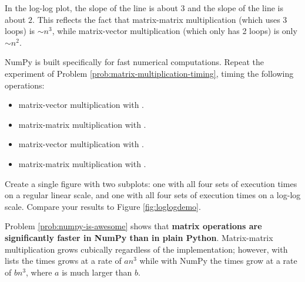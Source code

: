 In the log-log plot, the slope of the  line is about $3$ and the slope of the  line is about $2$.
This reflects the fact that matrix-matrix multiplication (which uses 3  loops) is $\sim n^3$, while matrix-vector multiplication (which only has 2 loops) is only $\sim n^2$.

\begin{problem} %
NumPy is built specifically for fast numerical computations.
Repeat the experiment of Problem \ref{prob:matrix-multiplication-timing}, timing the following operations:
%
\begin{itemize}
\item matrix-vector multiplication with .
\item matrix-matrix multiplication with .
\item matrix-vector multiplication with .
\item matrix-matrix multiplication with .
\end{itemize}

Create a single figure with two subplots: one with all four sets of execution times on a regular linear scale, and one with all four sets of execution times on a log-log scale.
Compare your results to Figure \ref{fig:loglogdemo}.
\label{prob:numpy-is-awesome}
\end{problem}


\begin{info} %
Problem \ref{prob:numpy-is-awesome} shows that \textbf{matrix  operations are significantly faster in NumPy than in plain Python}.
Matrix-matrix multiplication grows cubically regardless of the implementation; however, with lists the times grows at a rate of $an^3$ while with NumPy the times grow at a rate of $bn^3$, where $a$ is much larger than $b$.

%
\end{info}

